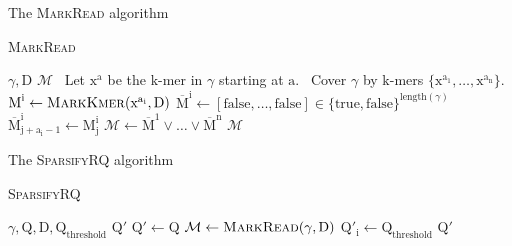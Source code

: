 \documentclass[12pt]{beamer}
\begin{document}
    \begin{frame}{The \textsc{MarkRead} algorithm}
        \begin{algorithm}[H]
            \caption{\textsc{MarkRead}}
            \begin{algorithmic}[1]
                \REQUIRE \(\gamma, \text{D}\)
                \ENSURE \(\mathcal{M}\)
                \STATE \, \COMMENT Let \(\text{x}^\text{a}\) be the \(\text{k}\)-mer in \(\gamma\) starting at \(\text{a}\).
                \STATE \, \COMMENT Cover \(\gamma\) by \(\text{k}\)-mers \(\{\text{x}^{\text{a}_\text{1}},\dots,\text{x}^{\text{a}_\text{n}}\}\).
                    \STATE \(\text{M}^\text{i} \leftarrow \text{\textsc{MarkKmer}}(\text{x}^{\text{a}_\text{i}},\text{D})\)
                    \STATE \(\overline{\text{M}}^\text{i} \leftarrow [\text{false},\dots,\text{false}]\in \{\text{true},\text{false}\}^{\text{length}(\gamma)}\)
                        \STATE \(\overline{\text{M}}^{\text{i}}_{\text{j}+\text{a}_\text{i}-1} \leftarrow \text{M}^\text{i}_\text{j}\)
                    \ENDFOR
                \ENDFOR
                \STATE \(\mathcal{M} \leftarrow \overline{\text{M}}^1 \lor \dots \lor \overline{\text{M}}^\text{n}\)
                \RETURN \(\mathcal{M}\)
            \end{algorithmic}
        \end{algorithm}
    \end{frame}

    \begin{frame}{The \textsc{SparsifyRQ} algorithm}
        \begin{algorithm}[H]
            \caption{\textsc{SparsifyRQ}}
            \begin{algorithmic}[1]
                \REQUIRE \(\gamma,\text{Q},\text{D},\text{Q}_{\text{threshold}}\)
                \ENSURE \(\text{Q}'\)
                \STATE \(\text{Q}' \leftarrow \text{Q}\)
                \STATE \(\mathcal{M} \leftarrow \text{\textsc{MarkRead}}(\gamma, \text{D})\)
                        \STATE \(\text{Q}'_\text{i} \leftarrow \text{Q}_{\text{threshold}}\)
                    \ENDIF
                \ENDFOR
                \RETURN \(\text{Q}'\)
            \end{algorithmic}
        \end{algorithm}
    \end{frame}
\end{document}
